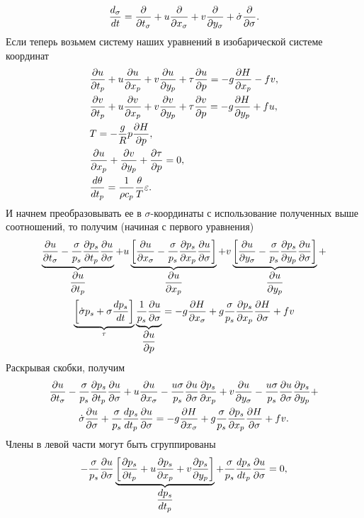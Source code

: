 \begin{equation*}
    \frac{d_{\sigma}}{dt} = \pd{}{t_{\sigma}} + u\pd{}{x_{\sigma}} + v\pd{}{y_{\sigma}} + \dot{\sigma}\pd{}{\sigma}.
\end{equation*}
Если теперь возьмем  систему  наших уравнений в изобарической системе координат 
\begin{align*}
    &\pd{u}{t_p} + u\pd{u}{x_p} + v\pd{u}{y_p} + \tau\pd{u}{p} = -g\pd{H}{x_p} - fv,\\ %
    &\pd{v}{t_p} + u\pd{v}{x_p} + v\pd{v}{y_p} + \tau\pd{v}{p} = -g\pd{H}{y_p} + fu,\\ %
    &T = -\frac{g}{R}p\pd{H}{p},\\
    &\pd{u}{x_p} + \pd{v}{y_p} + \pd{\tau}{p} = 0, \\
    &\td{\theta}{t_p} = \frac{1}{\rho c_p} \frac{\theta}{T}\varepsilon.
\end{align*}
И начнем преобразовывать ее в $\sigma$-координаты с использование полученных выше соотношений, то получим (начиная с первого уравнения)
\begin{multline*}
    \underbrace{\pd{u}{t_{\sigma}}-\frac{\sigma}{p_s}\pd{p_s}{t_p}\pd{u}{\sigma}}_{\pd{u}{t_p}} + 
    u\underbrace{\left[ \pd{u}{x_{\sigma}} - \frac{\sigma}{p_s} \pd{p_s}{x_p} \pd{u}{\sigma} \right]}_{\pd{u}{x_p}} + 
    v\underbrace{\left[ \pd{u}{y_{\sigma}} - \frac{\sigma}{p_s} \pd{p_s}{y_p} \pd{u}{\sigma} \right]}_{\pd{u}{y_p}} + \\
    \underbrace{\left[ \dot{\sigma}p_s + \sigma\td{p_s}{t} \right]}_{\tau} \underbrace{\frac{1}{p_s}\pd{u}{\sigma}}_{\pd{u}{p}} = 
    -g\pd{H}{x_{\sigma}} + g\frac{\sigma}{p_s}\pd{p_s}{x_p}\pd{H}{\sigma} + fv
\end{multline*}
Раскрывая скобки, получим
\begin{multline*}
    \pd{u}{t_{\sigma}} - 
    \frac{\sigma}{p_s}\pd{p_s}{t_p}\pd{u}{\sigma} + 
        u\pd{u}{x_{\sigma}} - \frac{u\sigma}{p_s}\pd{u}{\sigma}\pd{p_s}{x_p} + 
        v\pd{u}{y_{\sigma}} - \frac{u\sigma}{p_s}\pd{u}{\sigma}\pd{p_s}{y_p} + \\
        \dot{\sigma}\pd{u}{\sigma} + 
        \frac{\sigma}{p_s}\td{p_s}{t_p}\pd{u}{\sigma} = 
        -g\pd{H}{x_{\sigma}}+g\frac{\sigma}{p_s}\pd{p_s}{x_p}\pd{H}{\sigma}+fv.
\end{multline*}
Члены в левой части могут быть сгруппированы
\begin{equation*}
    -\frac{\sigma}{p_s}\pd{u}{\sigma} \underbrace{\left[ \pd{p_s}{t_p}+u\pd{p_s}{x_p}+v\pd{p_s}{y_p} \right]}_{\td{p_s}{t_p}} + 
    \frac{\sigma}{p_s}\td{p_s}{t_p}\pd{u}{\sigma} = 0,
\end{equation*}
